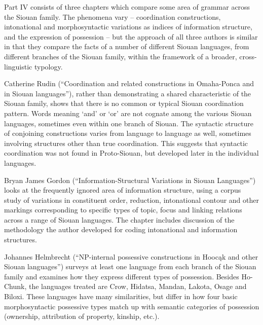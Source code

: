 \begin{refsection}

Part IV consists of three chapters which compare some area of grammar across the Siouan family. The phenomena vary -- coordination constructions, intonational and morphosyntactic variations as indices of information structure, and the expression of possession -- but the approach of all three authors is similar in that they compare the facts of a number of different Siouan languages, from different branches of the Siouan family, within the framework of a broader, cross-linguistic typology.

Catherine Rudin (``Coordination and related constructions in Omaha-Ponca and in Siouan languages''), rather than demonstrating a shared characteristic of the Siouan family, shows that there is no common or typical Siouan coordination pattern. Words meaning `and' or `or' are not cognate among the various Siouan languages, sometimes even within one branch of Siouan. The syntactic structure of conjoining constructions varies from language to language as well, sometimes involving structures other than true coordination. This suggests that syntactic coordination was not found in Proto-Siouan, but developed later in the individual languages.

Bryan James Gordon (``Information-Structural Variations in Siouan Languages'') looks at the frequently ignored area of information structure, using a corpus study of variations in constituent order, reduction, intonational contour and other markings corresponding to specific types of topic, focus and linking relations across a range of Siouan languages. The chapter includes discussion of the methodology the author developed for coding intonational and information structures.


Johannes Helmbrecht (``NP-internal possessive constructions in Hooc\k{a}k and other Siouan languages'') surveys at least one language from each branch of the Siouan family and examines how they express different types of possession. Besides Ho-Chunk, the languages treated are Crow, Hidatsa, Mandan, Lakota, Osage and Biloxi. These languages have many similarities, but differ in how four basic morphosyntactic possessive types match up with semantic categories of possession (ownership, attribution of property, kinship, etc.).






\end{refsection}

